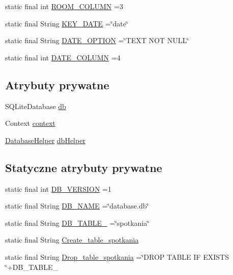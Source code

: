 \begin{DoxyCompactItemize}
\item 
static final int \hyperlink{classcom_1_1example_1_1qrpoll_1_1_sql_handler_aca9368d9d6803238b65e853fcf32a5aa}{R\+O\+O\+M\+\_\+\+C\+O\+L\+U\+M\+N} =3
\item 
static final String \hyperlink{classcom_1_1example_1_1qrpoll_1_1_sql_handler_a93e50d5f5a35250e6655f1d8f3192975}{K\+E\+Y\+\_\+\+D\+A\+T\+E} =\char`\"{}date\char`\"{}
\item 
static final String \hyperlink{classcom_1_1example_1_1qrpoll_1_1_sql_handler_a1d7af0faf52a8e5ba92eac4595bbb94c}{D\+A\+T\+E\+\_\+\+O\+P\+T\+I\+O\+N} =\char`\"{}T\+E\+X\+T N\+O\+T N\+U\+L\+L\char`\"{}
\item 
static final int \hyperlink{classcom_1_1example_1_1qrpoll_1_1_sql_handler_ad3e3a44b82059d37635eda84d51228e6}{D\+A\+T\+E\+\_\+\+C\+O\+L\+U\+M\+N} =4
\end{DoxyCompactItemize}
\subsection*{Atrybuty prywatne}
\begin{DoxyCompactItemize}
\item 
S\+Q\+Lite\+Database \hyperlink{classcom_1_1example_1_1qrpoll_1_1_sql_handler_a5b422e7952698eb1df158709d4e18007}{db}
\item 
Context \hyperlink{classcom_1_1example_1_1qrpoll_1_1_sql_handler_ab0071f750233a8b37790758a430d847c}{context}
\item 
\hyperlink{classcom_1_1example_1_1qrpoll_1_1_sql_handler_1_1_database_helper}{Database\+Helper} \hyperlink{classcom_1_1example_1_1qrpoll_1_1_sql_handler_a70cd37adedee066fc05708b0990c4f6c}{db\+Helper}
\end{DoxyCompactItemize}
\subsection*{Statyczne atrybuty prywatne}
\begin{DoxyCompactItemize}
\item 
static final int \hyperlink{classcom_1_1example_1_1qrpoll_1_1_sql_handler_a10db6c9a4c952c10c3e67c633797a244}{D\+B\+\_\+\+V\+E\+R\+S\+I\+O\+N} =1
\item 
static final String \hyperlink{classcom_1_1example_1_1qrpoll_1_1_sql_handler_a1e5b9131804451b9c7e6e9cd0eeb7187}{D\+B\+\_\+\+N\+A\+M\+E} =\char`\"{}database.\+db\char`\"{}
\item 
static final String \hyperlink{classcom_1_1example_1_1qrpoll_1_1_sql_handler_a5858d638c1d649a755b4f18614481a48}{D\+B\+\_\+\+T\+A\+B\+L\+E\+\_} =\char`\"{}spotkania\char`\"{}
\item 
static final String \hyperlink{classcom_1_1example_1_1qrpoll_1_1_sql_handler_a41cc7444128cfe954cd829ceb98d8df0}{Create\+\_\+table\+\_\+spotkania}
\item 
static final String \hyperlink{classcom_1_1example_1_1qrpoll_1_1_sql_handler_afed000c5d08d75442fbb860297d5d8b1}{Drop\+\_\+table\+\_\+spotkania} =\char`\"{}D\+R\+O\+P T\+A\+B\+L\+E I\+F E\+X\+I\+S\+T\+S \char`\"{}+D\+B\+\_\+\+T\+A\+B\+L\+E\+\_
\end{DoxyCompactItemize}


